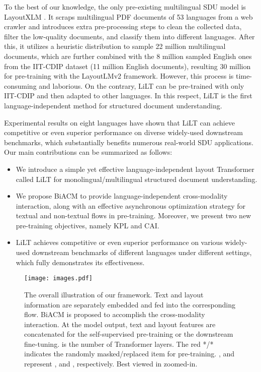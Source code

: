 \documentclass[11pt]{article}
\begin{document}
To the best of our knowledge,
the only pre-existing multilingual SDU model is LayoutXLM \cite{xu2021layoutxlm}. It scraps multilingual PDF documents of 53 languages from a web crawler and introduces extra pre-processing steps to clean the collected data, filter the low-quality  documents, and classify them into different languages.  After this, it utilizes a heuristic distribution to sample 22 million multilingual documents, which are further combined with the 8 million sampled English ones from the IIT-CDIP \cite{cdip} dataset (11 million English documents), resulting 30 million for pre-training with the LayoutLMv2 \cite{layoutlmv2} framework. However, this process is time-consuming and laborious.
On the contrary,  LiLT can be pre-trained with only IIT-CDIP  and then adapted to other languages. 
In this respect, 
LiLT is the first language-independent  method for structured document understanding.

Experimental results on eight languages have shown that LiLT  can achieve 
competitive or even superior performance on diverse widely-used downstream benchmarks, 
which substantially benefits numerous real-world SDU  applications. Our main contributions can be summarized as follows:
\begin{itemize}
\item We introduce a simple yet effective language-independent layout Transformer called LiLT for monolingual/multilingual structured document understanding. 
\item We  propose BiACM to provide  language-independent cross-modality  interaction,
along with an effective asynchronous optimization strategy for textual and non-textual flows in pre-training. 
Moreover, we present two new pre-training objectives, namely 
KPL and CAI.
\item LiLT achieves competitive or even superior performance on  various widely-used downstream benchmarks of different languages under 
different settings, which fully demonstrates its effectiveness.
\end{itemize}


\begin{figure*}[t]
\centering
\texttt{[image: images.pdf]}
\caption{The overall  illustration of our framework. 
Text and layout information are separately embedded and fed into the corresponding flow. 
BiACM is proposed to accomplish the cross-modality interaction. At the model output, text and layout features are concatenated for the self-supervised pre-training or the downstream fine-tuning.
 is the number of Transformer layers.
The red */* indicates the randomly masked/replaced item for pre-training. ,  and  represent ,  and , respectively. Best viewed in zoomed-in.} 
\label{pipeline}
\end{figure*}
\end{document}
